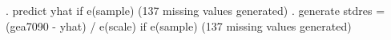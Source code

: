 . predict yhat if e(sample)
(137 missing values generated)
{\smallskip}
. generate stdres = (gea7090 - yhat) / e(scale) if e(sample)
(137 missing values generated)
{\smallskip}
